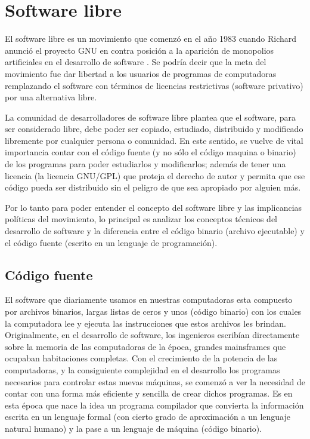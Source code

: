 \section{Software libre}

El software libre es un movimiento que comenzó en el año 1983 cuando Richard \cite{stallman_software_2007} anunció el proyecto GNU en contra posición a la aparición de monopolios artificiales en el desarrollo de software \citep{beatriz_busaniche_argentina_2010}. Se podría decir que la meta del movimiento fue dar libertad a los usuarios de programas de computadoras remplazando el software con términos de licencias restrictivas (software privativo)  por una alternativa libre.

La comunidad de desarrolladores de software libre plantea que el software, para ser considerado libre, debe poder ser copiado, estudiado, distribuido y modificado libremente por cualquier persona o comunidad. En este sentido, se vuelve de vital importancia contar con el código fuente (y no sólo el código maquina o binario) de los programas para poder estudiarlos y modificarlos; además de tener una licencia (la licencia GNU/GPL) que proteja el derecho de autor y permita que ese código pueda ser distribuido sin el peligro de que sea apropiado por alguien más.

Por lo tanto para poder entender el concepto del software libre y las implicancias políticas del movimiento, lo principal es analizar los conceptos técnicos del desarrollo de software y la diferencia entre el código binario (archivo ejecutable)  y el código fuente (escrito en un lenguaje de programación).

\subsection{Código fuente}

El software que diariamente usamos en nuestras computadoras esta compuesto por archivos  binarios, largas listas de ceros y unos (código binario) con los cuales la computadora lee y ejecuta las instrucciones que estos archivos les brindan. Originalmente, en el desarrollo de software, los ingenieros escribían directamente sobre la memoria de las computadoras de la época, grandes mainsframes que ocupaban habitaciones completas. Con el crecimiento de la potencia de las computadoras, y la consiguiente complejidad en el desarrollo  los programas necesarios para controlar estas nuevas máquinas, se comenzó a ver la necesidad de contar con una forma más eficiente y sencilla de crear dichos programas. Es en esta época que nace la idea un programa compilador que convierta la información escrita en un lenguaje formal (con cierto grado de aproximación a un lenguaje natural humano) y la pase a un lenguaje de máquina (código binario).

